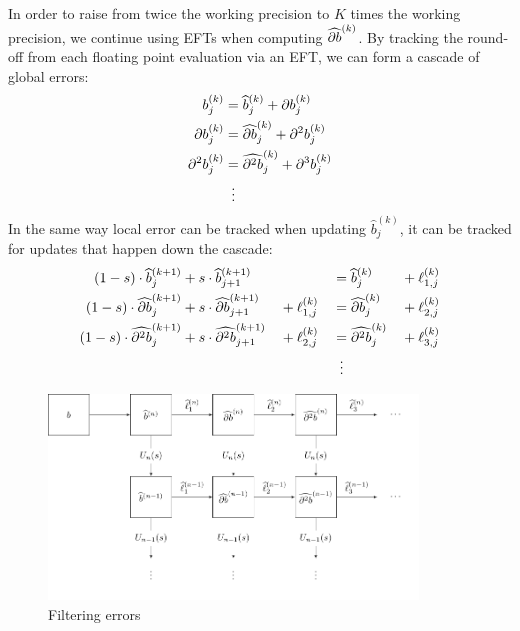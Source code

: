In order to raise from twice the working precision to \(K\) times the
working precision, we continue using EFTs when computing
\(\cdb{1}^{(k)}\). By tracking the round-off from each
floating point evaluation via an EFT, we can form a cascade of global errors:
\begin{align}
  b_j^{(k)} &= \widehat{b}_j^{(k)} + \db{1}_j^{(k)} \\
  \db{1}_j^{(k)} &= \cdb{1}_j^{(k)} + \db{2}_j^{(k)} \\
  \db{2}_j^{(k)} &= \cdb{2}_j^{(k)} +
  \db{3}_j^{(k)} \\
  &\mathrel{\makebox[\widthof{=}]{\vdots}} \nonumber
\end{align}
In the same way local error can be tracked when updating
\(\widehat{b}_j^{(k)}\), it can be tracked for updates that happen down
the cascade:
\begin{alignat}{4}
  (1 - s) \cdot \widehat{b}_j^{(k + 1)} &+
  s \cdot \widehat{b}_{j + 1}^{(k + 1)} &&  &&=
  \widehat{b}_j^{(k)} &&+ \ell_{1, j}^{(k)} \\
  (1 - s) \cdot \cdb{1}_j^{(k + 1)} &+
  s \cdot \cdb{1}_{j + 1}^{(k + 1)} &&+ \ell_{1, j}^{(k)} &&=
  \cdb{1}_j^{(k)} &&+ \ell_{2, j}^{(k)} \\
  (1 - s) \cdot \cdb{2}_j^{(k + 1)} &+
  s \cdot \cdb{2}_{j + 1}^{(k + 1)} &&+ \ell_{2, j}^{(k)} &&=
  \cdb{2}_j^{(k)} &&+ \ell_{3, j}^{(k)} \\
  &  &&  &&\mathrel{\makebox[\widthof{=}]{\vdots}} && \nonumber
\end{alignat}

\begin{figure}
  \includegraphics[width=0.875\textwidth]{tikz_filtration.pdf}
  \centering
  \captionsetup{width=.75\linewidth}
  \caption{Filtering errors}
  \label{fig:error-filtration}
\end{figure}

